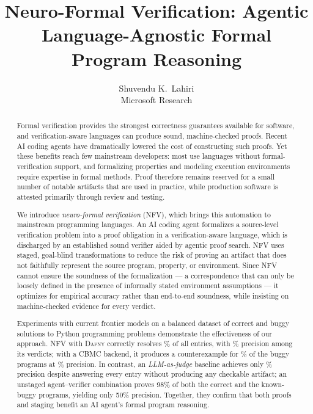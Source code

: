 \documentclass[11pt,letterpaper]{article}
\newcommand{\daf}{\textsc{Dafny}}
\newcommand{\cbmc}{\textsc{CBMC}}
\begin{document}
\title{Neuro-Formal Verification: Agentic Language-Agnostic Formal Program Reasoning}
\author{Shuvendu K.\ Lahiri\\Microsoft Research}
\date{}
\maketitle

\begin{abstract}
Formal verification provides the strongest correctness guarantees available
for software, and verification-aware languages can produce sound,
machine-checked proofs. Recent AI coding agents have dramatically lowered the
cost of constructing such proofs. Yet these benefits reach few mainstream
developers: most use languages without formal-verification support, and
formalizing properties and modeling execution environments require expertise
in formal methods. Proof therefore remains reserved for a small number of
notable artifacts that are used in practice, while production software is
attested primarily through review and testing.

We introduce \emph{neuro-formal verification} (NFV), which brings this
automation to mainstream programming languages. An AI coding agent formalizes
a source-level verification problem into a proof obligation in a
verification-aware language, which is discharged by an established sound
verifier aided by agentic proof search. NFV uses staged, goal-blind
transformations to reduce the risk of proving an artifact that does not
faithfully represent the source program, property, or environment. Since NFV
cannot ensure the soundness of the formalization --- a correspondence that can
only be loosely defined in the presence of informally stated environment
assumptions --- it optimizes for empirical accuracy rather than
end-to-end soundness, while insisting on machine-checked evidence for every
verdict.

Experiments with current frontier models on a balanced dataset of correct and
buggy solutions to Python programming problems demonstrate the effectiveness
of our approach. NFV with \daf{} correctly resolves \anpiperec{}\% of all
entries, with \anpipeprec{}\% precision among its verdicts; with a \cbmc{}
backend, it produces a counterexample for \cbmccexrec{}\% of the buggy
programs at \cbmccexprec{}\% precision. In contrast, an \emph{LLM-as-judge}
baseline achieves only \jdgallprec{}\% precision despite answering every entry
without producing any checkable artifact; an unstaged agent--verifier
combination proves 98\% of both the correct and the known-buggy programs,
yielding only 50\% precision. Together, they confirm that both proofs and
staging benefit an AI agent's formal program reasoning.
\end{abstract}
\end{document}
